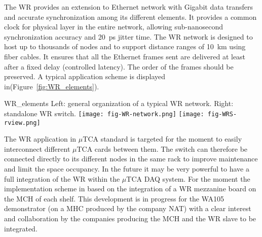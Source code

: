 The WR provides an extension to Ethernet network with Gigabit data
transfers and accurate synchronization among its different
elements. It provides a common clock for physical layer in the entire
network, allowing sub-nanosecond synchronization accuracy and 20~ps
jitter time. The WR network is designed to host up to thousands of
nodes and to support distance ranges of 10~km using fiber cables. It
ensures that all the Ethernet frames sent are delivered at least after
a fixed delay (controlled latency). The order of the frames should be
preserved.  A typical application scheme is displayed
in(Figure~\ref{fig:WR_elements}).
\begin{cdrfigure}{WR_elements}
{\small Left: general organization of a typical WR network. Right: standalone WR switch.}
\texttt{[image: fig-WR-network.png]}
\texttt{[image: fig-WRS-rview.png]}
\end{cdrfigure}

The WR application in $\mu$TCA standard is targeted for the moment to
easily interconnect different $\mu$TCA cards between them. The switch
can therefore be connected directly to its different nodes in the same
rack to improve maintenance and limit the space occupancy. In the
future it may be very powerful to have a full integration of the WR
within the $\mu$TCA DAQ system. For the moment the implementation
scheme in based on the integration of a WR mezzanine board on the MCH
of each shelf. This development is in progress for the WA105
demonstrator (on a MHC produced by the company NAT) with a clear
interest and collaboration by the companies producing the MCH and the
WR slave to be integrated.
